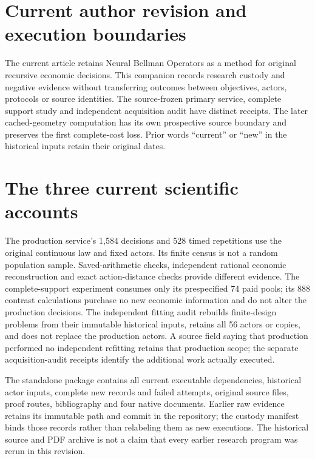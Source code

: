 \section{Current author revision and execution boundaries}\label{dev:current126}
The current article retains Neural Bellman Operators as a method for original
recursive economic decisions. This companion records research custody and
negative evidence without transferring outcomes between objectives, actors,
protocols or source identities. The source-frozen primary service, complete
support study and independent acquisition audit have distinct receipts.
The later cached-geometry computation has its own prospective source boundary
and preserves the first complete-cost loss. Prior words ``current'' or ``new''
in the historical inputs retain their original dates.



\section{The three current scientific accounts}
The production service's 1,584 decisions and 528 timed repetitions use the
original continuous law and fixed actors. Its finite census is not a random
population sample. Saved-arithmetic checks, independent rational economic
reconstruction and exact action-distance checks provide different evidence.
The complete-support experiment consumes only its prespecified 74 paid pools;
its 888 contrast calculations purchase no new economic information and do
not alter the production decisions. The independent fitting audit rebuilds
finite-design problems from their immutable historical inputs, retains all
56 actors or copies, and does not replace the production actors. A source
field saying that production performed no independent refitting retains that
production scope; the separate acquisition-audit receipts identify the
additional work actually executed.

The standalone package contains all current executable dependencies, historical
actor inputs, complete new records and failed attempts, original source files,
proof routes, bibliography and four native documents. Earlier raw evidence
retains its immutable path and commit in the repository; the custody manifest
binds those records rather than relabeling them as new executions. The
historical source and PDF archive is not a claim that every earlier research
program was rerun in this revision.




